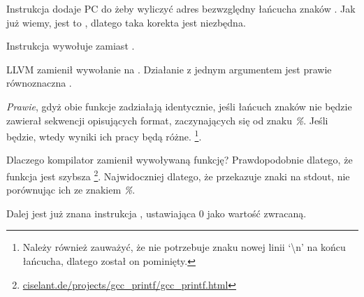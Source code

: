 Instrukcja  dodaje \ac{PC} do  żeby wyliczyć adres bezwzględny łańcucha znaków . Jak już wiemy, jest to \q{\PICcode}, dlatego taka korekta jest niezbędna.

Instrukcja  wywołuje \puts zamiast \printf.

\label{puts}
LLVM zamienił wywołanie \printf na \puts.
Działanie \printf z jednym argumentem jest prawie równoznaczna \puts.
 
\emph{Prawie}, gdyż obie funkcje zadziałają identycznie, jeśli łańcuch znaków nie będzie zawierał sekwencji opisujących format, zaczynających się od znaku \emph{\%}. Jeśli będzie, wtedy wyniki ich pracy będą różne.
\footnote{Należy również zauważyć, że \puts nie potrzebuje znaku nowej linii `\textbackslash{}n' na końcu łańcucha,
dlatego został on pominięty.}.

Dlaczego kompilator zamienił wywoływaną funkcję? Prawdopodobnie dlatego, że funkcja \puts jest szybsza
\footnote{\href{http://www.ciselant.de/projects/gcc_printf/gcc_printf.html}{ciselant.de/projects/gcc\_printf/gcc\_printf.html}}. 
Najwidoczniej dlatego, że \puts przekazuje znaki na \gls{stdout}, nie porównując ich ze znakiem \emph{\%}.

Dalej jest już znana instrukcja , ustawiająca 0 jako wartość zwracaną.


